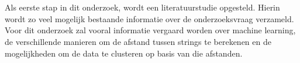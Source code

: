 \chapter{}%
\label{ch:stand-van-zaken}







Als eerste stap in dit onderzoek, wordt een literatuurstudie opgesteld. Hierin wordt zo veel mogelijk bestaande informatie over de onderzoeksvraag verzameld. Voor dit onderzoek zal vooral informatie vergaard worden over machine learning, de verschillende manieren om de afstand tussen strings te berekenen en de mogelijkheden om de data te clusteren op basis van die afstanden.


